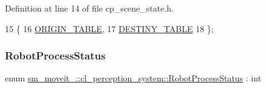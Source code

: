 Definition at line 14 of file cp\+\_\+scene\+\_\+state.\+h.


\begin{DoxyCode}
15         \{
16             \hyperlink{namespacesm__moveit__4_1_1cl__perception__system_a0d1b8834532a7cf9d19670791eece6d1a5ca85581c7ec4e3161b6acf53f8bf0c9}{ORIGIN\_TABLE},
17             \hyperlink{namespacesm__moveit__4_1_1cl__perception__system_a0d1b8834532a7cf9d19670791eece6d1abe7910796fc800b37d9dd2514994614c}{DESTINY\_TABLE}
18         \};
\end{DoxyCode}
\mbox{\label{namespacesm__moveit__4_1_1cl__perception__system_a11dfa58fc66f2d368b894a9f1fec870e}} 
\subsubsection{\texorpdfstring{Robot\+Process\+Status}{RobotProcessStatus}}
{\footnotesize\ttfamily enum \hyperlink{namespacesm__moveit__4_1_1cl__perception__system_a11dfa58fc66f2d368b894a9f1fec870e}{sm\+\_\+moveit\+\_\+::cl\+\_\+perception\+\_\+system\+::\+Robot\+Process\+Status} \+: int\hspace{0.3cm}{\ttfamily [strong]}}

